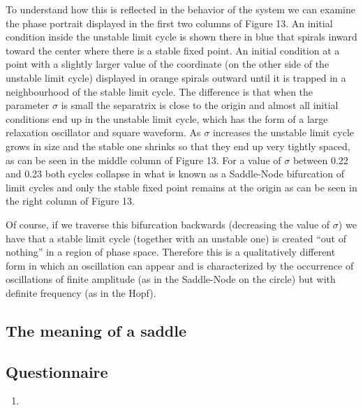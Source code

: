 \documentclass{article}
\begin{document}
To understand how this is reflected in the behavior of the system we can examine the phase portrait displayed in the first two columns of Figure 13. 
An initial condition inside the unstable limit cycle is shown there in blue that spirals inward toward the center where there is a stable fixed point. 
An initial condition at a point with a slightly larger value of the coordinate (on the other side of the unstable limit cycle) displayed in orange spirals outward until it is trapped in a neighbourhood of the stable limit cycle. 
The difference is that when the parameter $\sigma$ is small the separatrix is close to the origin and almost all initial conditions end up in the unstable limit cycle, which has the form of a large relaxation oscillator and square waveform. 
As $\sigma$ increases the unstable limit cycle grows in size and the stable one shrinks so that they end up very tightly spaced, as can be seen in the middle column of Figure 13. 
For a value of $\sigma$ between 0.22 and 0.23 both cycles collapse in what is known as a Saddle-Node bifurcation of limit cycles and only the stable fixed point remains at the origin as can be seen in the right column of Figure 13. 

Of course, if we traverse this bifurcation backwards (decreasing the value of $\sigma$) we have that a stable limit cycle (together with an unstable one) is created “out of nothing” in a region of phase space. 
Therefore this is a qualitatively different form in which an oscillation can appear and is characterized by the occurrence of oscillations of finite amplitude (as in the Saddle-Node on the circle) but with definite frequency (as in the Hopf).




\begin{figure}[h]
    \centering
    \caption{} 
    \label{fig_friction2}
\end{figure}

\subsection{The meaning of a saddle}

\subsection{Questionnaire}
\begin{enumerate}
\item 
\end{enumerate}
\end{document}
